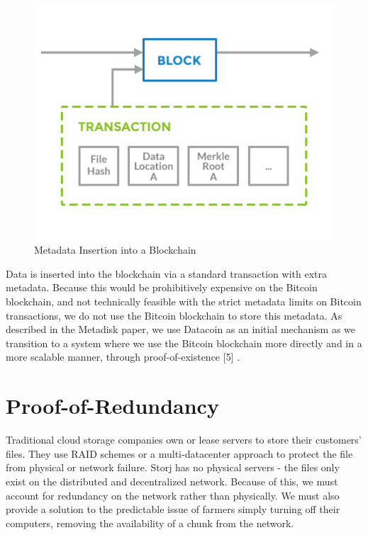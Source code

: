 \documentclass[a4paper,10pt]{article}
\begin{document}
\begin{figure}[h!]
\centering
\includegraphics[width=\linewidth]{3}
\caption{Metadata Insertion into a Blockchain}
\end{figure}

Data is inserted into the blockchain via a standard transaction with extra metadata. Because this would be prohibitively expensive on the Bitcoin blockchain, and not technically feasible with the strict metadata limits on Bitcoin transactions, we do not use the Bitcoin blockchain to store this metadata. As described in the Metadisk \cite{1} paper, we use Datacoin \cite{6} as an initial mechanism as we transition to a system where we use the Bitcoin blockchain more directly and in a more scalable manner, through proof-of-existence \cite{4} [5] \cite{7}.  

\section{Proof-of-Redundancy}
Traditional cloud storage companies own or lease servers to store their customers’ files. They use RAID schemes or a multi-datacenter approach to protect the file from physical or network failure. Storj has no physical servers - the files only exist on the distributed and decentralized network. Because of this, we must account for redundancy on the network rather than physically. We must also provide a solution to the predictable issue of farmers simply turning off their computers, removing the availability of a chunk from the network. \\
\end{document}
